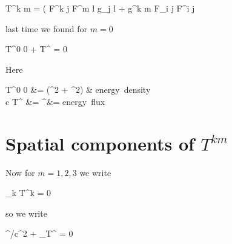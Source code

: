 T^{k m} = \inv{4 \pi} \left( F^{k j} F^{m l} g_{j l} +  g^{k m} F_{i j} F^{i j}

last time we found for $m = 0$

 \PDt T^{0 0} +  T^{} = 0

Here

T^{0 0} &= \inv{8 \pi} (\BE^2 + \BB^2) & \mbox{energy density} \\
c T^{} &= \BS^\alpha &= \mbox{energy flux}

\section{Spatial components of $T^{k m}$}

Now for $m = 1,2,3$ we write

\partial_k T^{k \alpha} = 0

so we write

\PDt \BS^\alpha/c^2 + \partial_\beta T^{\beta \alpha} = 0

\EndArticle
